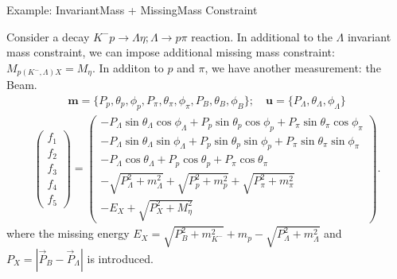 \documentclass[
	xcolor=dvipsnames,
	aspectratio=169,	
	10pt, 
	]{beamer}
\begin{document}
\begin{frame}{Example: InvariantMass + MissingMass Constraint}
	\begin{block}{}
		Consider a decay $K^-p\to \Lambda\eta;\Lambda\to p\pi$ reaction.
		In additional to the $\Lambda$ invariant mass constraint, we can impose additional missing mass constraint: $M_{p(K^-,\Lambda) X} = M_{\eta}$.
		In additon to $p$ and $\pi$, we have another measurement: the Beam.
		\begin{align}
			\mathbf{m}=\{P_p,\theta_p,\phi_p,P_\pi,\theta_\pi,\phi_\pi,P_B,\theta_B,\phi_B\};\quad\mathbf{u} = \{P_\Lambda,\theta_\Lambda,\phi_\Lambda\}
		\end{align}
		\begin{align}
			\begin{pmatrix}
				f_1\\f_2\\f_3\\f_4\\f_5
			\end{pmatrix}=
			\begin{pmatrix}
				-P_\Lambda\sin\theta_\Lambda\cos\phi_\Lambda+P_p\sin\theta_p\cos\phi_p+P_\pi\sin\theta_\pi\cos\phi_\pi\\
				-P_\Lambda\sin\theta_\Lambda\sin\phi_\Lambda+P_p\sin\theta_p\sin\phi_p+P_\pi\sin\theta_\pi\sin\phi_\pi\\
				-P_\Lambda\cos\theta_\Lambda+P_p\cos\theta_p+P_\pi\cos\theta_\pi\\
				-\sqrt{P_\Lambda^2+m_\Lambda^2}+\sqrt{P_p^2+m_p^2}+\sqrt{P_\pi^2+m_\pi^2}\\
				-E_X + \sqrt{P_X^2+M_\eta^2}
			\end{pmatrix}.\label{FMat}
		\end{align}
		where the missing energy $E_X=\sqrt{P_B^2+m_{K^-}^2}+m_p - \sqrt{P_\Lambda^2+m_\Lambda^2}$ and $P_X = |\vec P_B-\vec P_\Lambda|$ is introduced.
	\end{block}
\end{frame}
\end{document}
